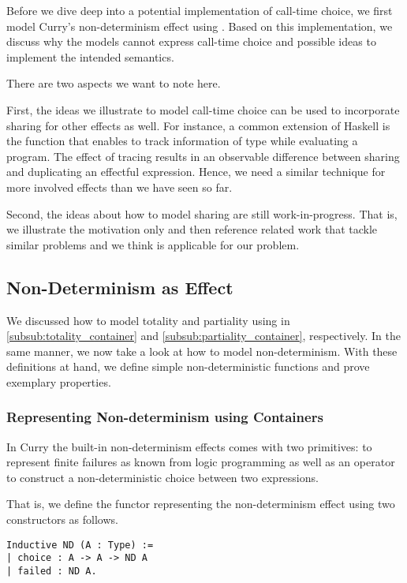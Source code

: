 Before we dive deep into a potential implementation of call-time choice, we first model Curry's non-determinism effect using
.
Based on this implementation, we discuss why the models cannot express call-time choice and possible ideas to implement the intended semantics.

There are two aspects we want to note here.

First, the ideas we illustrate to model call-time choice can be used to incorporate sharing for other effects as well.
For instance, a common extension of Haskell is the function  that enables to track information of type  while evaluating a program.
The effect of tracing results in an observable difference between sharing and duplicating an effectful expression.
Hence, we need a similar technique for more involved effects than we have seen so far.

Second, the ideas about how to model sharing are still work-in-progress.
That is, we illustrate the motivation only and then reference related work that tackle similar problems and we think is applicable for our problem.

\subsection{Non-Determinism as Effect}

We discussed how to model totality and partiality using  in \autoref{subsub:totality_container} and \autoref{subsub:partiality_container}, respectively.
In the same manner, we now take a look at how to model non-determinism.
With these definitions at hand, we define simple non-deterministic functions and prove exemplary properties.

\subsubsection{Representing Non-determinism using Containers}
In Curry the built-in non-determinism effects comes with two primitives:  to represent finite failures as known from logic programming as well as an operator  to construct a non-deterministic choice between two expressions.

That is, we define the functor representing the non-determinism effect using two constructors as follows. 

\begin{verbatim}
Inductive ND (A : Type) :=
| choice : A -> A -> ND A
| failed : ND A.
\end{verbatim}

